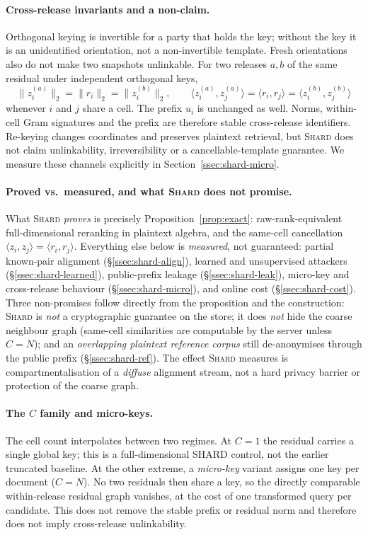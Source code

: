 \paragraph{Cross-release invariants and a non-claim.} Orthogonal keying is
invertible for a party that holds the key; without the key it is an
unidentified orientation, not a non-invertible template. Fresh orientations
also do not make two snapshots unlinkable. For two releases $a,b$ of the same
residual under independent orthogonal keys,
\[
\|z_i^{(a)}\|_2=\|r_i\|_2=\|z_i^{(b)}\|_2,
\qquad
\langle z_i^{(a)},z_j^{(a)}\rangle
=\langle r_i,r_j\rangle
=\langle z_i^{(b)},z_j^{(b)}\rangle
\]
whenever $i$ and $j$ share a cell. The prefix $u_i$ is unchanged as well.
Norms, within-cell Gram signatures and the prefix are therefore stable
cross-release identifiers. Re-keying changes coordinates and preserves
plaintext retrieval, but \textsc{Shard} does not claim unlinkability,
irreversibility or a cancellable-template guarantee. We measure these
channels explicitly in Section~\ref{ssec:shard-micro}.

\paragraph{Proved vs.\ measured, and what \textsc{Shard} does not promise.}
What \textsc{Shard} \emph{proves} is precisely Proposition~\ref{prop:exact}:
raw-rank-equivalent full-dimensional reranking in plaintext algebra, and the same-cell cancellation
$\langle z_i,z_j\rangle=\langle r_i,r_j\rangle$. Everything else below is
\emph{measured}, not guaranteed: partial known-pair alignment
(\S\ref{ssec:shard-align}), learned and unsupervised attackers
(\S\ref{ssec:shard-learned}), public-prefix leakage
(\S\ref{ssec:shard-leak}), micro-key and cross-release behaviour
(\S\ref{ssec:shard-micro}), and online cost
(\S\ref{ssec:shard-cost}). Three non-promises follow directly from the
proposition and the construction: \textsc{Shard} is \emph{not} a cryptographic
guarantee on the store; it does \emph{not} hide the coarse neighbour graph
(same-cell similarities are computable by the server unless $C{=}N$); and an
\emph{overlapping plaintext reference corpus} still de-anonymises through the
public prefix (\S\ref{ssec:shard-ref}). The effect \textsc{Shard} measures is
compartmentalisation of a \emph{diffuse} alignment stream, not a hard privacy
barrier or protection of the coarse graph.

\paragraph{The $C$ family and micro-keys.} The cell count interpolates
between two regimes. At $C{=}1$ the residual carries a single global key;
this is a full-dimensional SHARD control, not the earlier truncated baseline.
At the other extreme, a \emph{micro-key} variant assigns one key per
document ($C{=}N$). No two residuals then share a key, so the directly
comparable within-release residual graph vanishes, at the cost of one
transformed query per candidate. This does not remove the stable prefix or
residual norm and therefore does not imply cross-release unlinkability.

